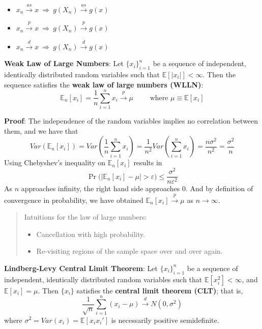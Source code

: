 \documentclass[12pt,]{book}
\providecommand{\tightlist}{%
  \setlength{\itemsep}{0pt}\setlength{\parskip}{0pt}}
\begin{document}
\begin{itemize}
\tightlist
\item
  \(x _n \overset{as}{\to} x \ \Rightarrow \ g(X_n) \overset{as}{\to} g(x)\)
\item
  \(x _n \overset{p}{\to} x \ \Rightarrow \ g(X_n) \overset{p}{\to} g(x)\)
\item
  \(x _n \overset{d}{\to} x \ \Rightarrow \ g(X_n) \overset{d}{\to} g(x)\)
\end{itemize}

\textbf{Weak Law of Large Numbers}:
Let \(\{ x_i \} _ {i=1}^n\) be a sequence of independent, identically distributed random variables such that \(\mathbb{E}[|x_i|] < \infty\). Then the sequence satisfies the \textbf{weak law of large numbers (WLLN)}:
\[
    \mathbb{E}_n[x_i] = \frac{1}{n} \sum _ {i=1}^n x_i \overset{p}{\to} \mu \qquad \text{ where } \mu \equiv \mathbb{E}[x_i] 
\]

\textbf{Proof}:
The independence of the random variables implies no correlation between them, and we have that
\[
    Var \left( \mathbb{E}_n[x_i] \right) = Var \left( \frac{1}{n} \sum _ {i=1}^n x_i \right) = \frac{1}{n^2} Var\left( \sum _ {i=1}^n x_i \right) = \frac{n \sigma^2}{n^2} = \frac{\sigma^2}{n}
\]
Using Chebyshev's inequality on \(\mathbb{E}_n[x_i]\) results in
\[
    \Pr \big( \left|\mathbb{E}_n[x_i]-\mu \right| > \varepsilon \big) \leq {\frac {\sigma ^{2}}{n\varepsilon ^{2}}}
\]
As \(n\) approaches infinity, the right hand side approaches \(0\). And by definition of convergence in probability, we have obtained \(\mathbb{E}_n[x_i] \overset{p}{\to} \mu\) as \(n \to \infty\).
\[\tag*{$\blacksquare$}\]

\begin{quote}
Intuitions for the law of large numbers:

\begin{itemize}
\tightlist
\item
  Cancellation with high probability.
\item
  Re-visiting regions of the sample space over and over again.
\end{itemize}
\end{quote}

\textbf{Lindberg-Levy Central Limit Theorem}:
Let \(\{ x_i \} _ {i=1}^n\) be a sequence of independent, identically distributed random variables such that \(\mathbb{E}[x_i^2] < \infty\), and \(\mathbb{E}[x_i] = \mu\). Then \(\{ x_i \}\) satisfies the \textbf{central limit theorem (CLT)}; that is,
\[
    \frac{1}{\sqrt{n}} \sum _ {i=1}^{n} (x_i - \mu) \overset{d}{\to} N(0,\sigma^2)
\]
where \(\sigma^2 = Var(x_i) = \mathbb{E}[x_i x_i']\) is necessarily positive semidefinite.
\end{document}
